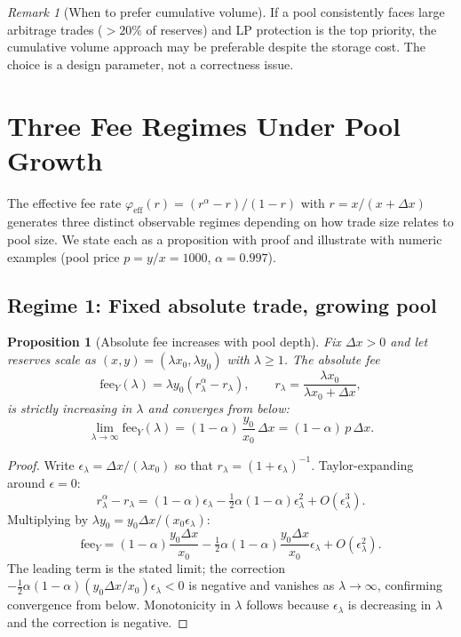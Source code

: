 \documentclass[11pt]{article}
\newtheorem{proposition}[theorem]{Proposition}
\theoremstyle{definition}
\theoremstyle{remark}
\newtheorem{remark}[theorem]{Remark}
\newcommand{\dx}{\Delta x}
\begin{document}
\begin{remark}[When to prefer cumulative volume]
If a pool consistently faces large arbitrage trades ($>20\%$ of reserves) and LP protection is the top priority, the cumulative volume approach may be preferable despite the storage cost.
The choice is a design parameter, not a correctness issue.
\end{remark}


\section{Three Fee Regimes Under Pool Growth}\label{sec:three-regimes}

The effective fee rate $\varphi_{\mathrm{eff}}(r)=(r^\alpha-r)/(1-r)$ with $r=x/(x{+}\dx)$ generates three distinct observable regimes depending on how trade size relates to pool size.
We state each as a proposition with proof and illustrate with numeric examples (pool price $p=y/x=1000$, $\alpha=0.997$).

\subsection{Regime 1: Fixed absolute trade, growing pool}

\begin{proposition}[Absolute fee increases with pool depth]\label{prop:regime1}
Fix $\dx>0$ and let reserves scale as $(x,y)=(\lambda x_0,\lambda y_0)$ with $\lambda\ge 1$.
The absolute fee
\[
\mathrm{fee}_Y(\lambda)=\lambda y_0\!\left(r_\lambda^\alpha-r_\lambda\right),\qquad r_\lambda=\frac{\lambda x_0}{\lambda x_0+\dx},
\]
is strictly increasing in $\lambda$ and converges from below:
\[
\boxed{\lim_{\lambda\to\infty}\mathrm{fee}_Y(\lambda)=(1-\alpha)\,\frac{y_0}{x_0}\,\dx=(1-\alpha)\,p\,\dx.}
\]
\end{proposition}

\begin{proof}
Write $\epsilon_\lambda=\dx/(\lambda x_0)$ so that $r_\lambda=(1+\epsilon_\lambda)^{-1}$.
Taylor-expanding around $\epsilon=0$:
\[
r_\lambda^\alpha - r_\lambda
= (1-\alpha)\epsilon_\lambda - \tfrac{1}{2}\alpha(1-\alpha)\epsilon_\lambda^2 + O(\epsilon_\lambda^3).
\]
Multiplying by $\lambda y_0 = y_0\dx/(x_0\epsilon_\lambda)$:
\[
\mathrm{fee}_Y = (1-\alpha)\frac{y_0\dx}{x_0}
  - \tfrac{1}{2}\alpha(1-\alpha)\frac{y_0\dx}{x_0}\epsilon_\lambda
  + O(\epsilon_\lambda^2).
\]
The leading term is the stated limit; the correction $-\tfrac{1}{2}\alpha(1-\alpha)(y_0\dx/x_0)\epsilon_\lambda<0$ is negative and vanishes as $\lambda\to\infty$, confirming convergence from below.
Monotonicity in $\lambda$ follows because $\epsilon_\lambda$ is decreasing in $\lambda$ and the correction is negative.
\end{proof}
\end{document}
